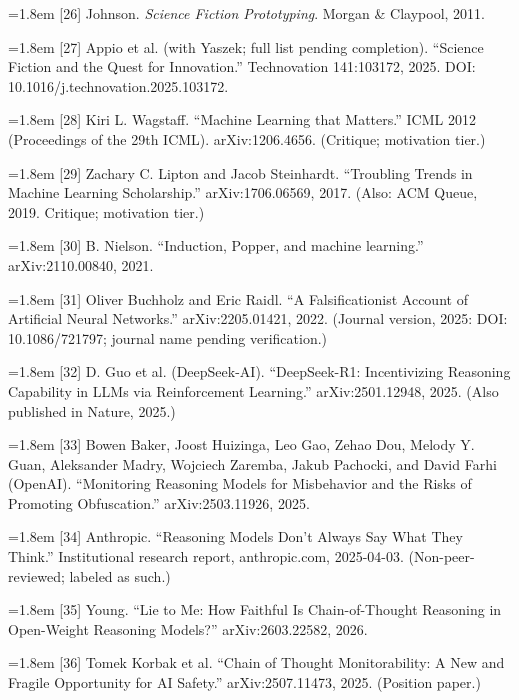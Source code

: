\documentclass[11pt]{article}
\begin{document}
\noindent\hangindent=1.8em [26] Johnson. \emph{Science Fiction Prototyping}. Morgan \& Claypool, 2011.\par\medskip
\noindent\hangindent=1.8em [27] Appio et al. (with Yaszek; full list pending completion). ``Science Fiction and the Quest for Innovation.'' Technovation 141:103172, 2025. DOI: 10.1016/j.technovation.2025.103172.\par\medskip
\noindent\hangindent=1.8em [28] Kiri L. Wagstaff. ``Machine Learning that Matters.'' ICML 2012 (Proceedings of the 29th ICML). arXiv:1206.4656. (Critique; motivation tier.)\par\medskip
\noindent\hangindent=1.8em [29] Zachary C. Lipton and Jacob Steinhardt. ``Troubling Trends in Machine Learning Scholarship.'' arXiv:1706.06569, 2017. (Also: ACM Queue, 2019. Critique; motivation tier.)\par\medskip
\noindent\hangindent=1.8em [30] B. Nielson. ``Induction, Popper, and machine learning.'' arXiv:2110.00840, 2021.\par\medskip
\noindent\hangindent=1.8em [31] Oliver Buchholz and Eric Raidl. ``A Falsificationist Account of Artificial Neural Networks.'' arXiv:2205.01421, 2022. (Journal version, 2025: DOI: 10.1086/721797; journal name pending verification.)\par\medskip
\noindent\hangindent=1.8em [32] D. Guo et al. (DeepSeek-AI). ``DeepSeek-R1: Incentivizing Reasoning Capability in LLMs via Reinforcement Learning.'' arXiv:2501.12948, 2025. (Also published in Nature, 2025.)\par\medskip
\noindent\hangindent=1.8em [33] Bowen Baker, Joost Huizinga, Leo Gao, Zehao Dou, Melody Y. Guan, Aleksander Madry, Wojciech Zaremba, Jakub Pachocki, and David Farhi (OpenAI). ``Monitoring Reasoning Models for Misbehavior and the Risks of Promoting Obfuscation.'' arXiv:2503.11926, 2025.\par\medskip
\noindent\hangindent=1.8em [34] Anthropic. ``Reasoning Models Don't Always Say What They Think.'' Institutional research report, anthropic.com, 2025-04-03. (Non-peer-reviewed; labeled as such.)\par\medskip
\noindent\hangindent=1.8em [35] Young. ``Lie to Me: How Faithful Is Chain-of-Thought Reasoning in Open-Weight Reasoning Models?'' arXiv:2603.22582, 2026.\par\medskip
\noindent\hangindent=1.8em [36] Tomek Korbak et al. ``Chain of Thought Monitorability: A New and Fragile Opportunity for AI Safety.'' arXiv:2507.11473, 2025. (Position paper.)\par\medskip
\end{document}
